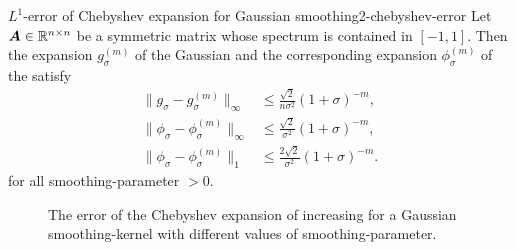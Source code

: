 \begin{lemma}{$L^1$-error of Chebyshev expansion for Gaussian smoothing}{2-chebyshev-error}
    Let $\boldsymbol{A} \in \mathbb{R}^{n \times n}$ be a symmetric matrix whose spectrum
    is contained in $[-1, 1]$. Then the expansion $g_{\sigma}^{(m)}$ of the Gaussian 
    and the corresponding expansion $\phi_{\sigma}^{(m)}$ of the  satisfy
    \begin{align}
        \lVert  g_{\sigma} - g_{\sigma}^{(m)} \rVert _{\infty} &\leq \frac{\sqrt{2}}{n \sigma^2} (1 + \sigma)^{-m},
        \label{equ:2-chebyshev-interpolation-sup-error-kernel} \\
        \lVert  \phi_{\sigma} - \phi_{\sigma}^{(m)} \rVert _{\infty} &\leq \frac{\sqrt{2}}{\sigma^2} (1 + \sigma)^{-m},
        \label{equ:2-chebyshev-interpolation-sup-error} \\
        \lVert  \phi_{\sigma} - \phi_{\sigma}^{(m)} \rVert _1 &\leq \frac{2\sqrt{2}}{\sigma^2} (1 + \sigma)^{-m}.
        \label{equ:2-chebyshev-interpolation-error}
    \end{align}
    for all \gls{smoothing-parameter} $>0$.
\end{lemma}

\begin{figure}[ht]
    \centering
    
    \caption{The error of the Chebyshev expansion of increasing 
    for a Gaussian \gls{smoothing-kernel} with different values of \gls{smoothing-parameter}.}
    \label{fig:2-chebyshev-chebyshev-convergence}
\end{figure}


